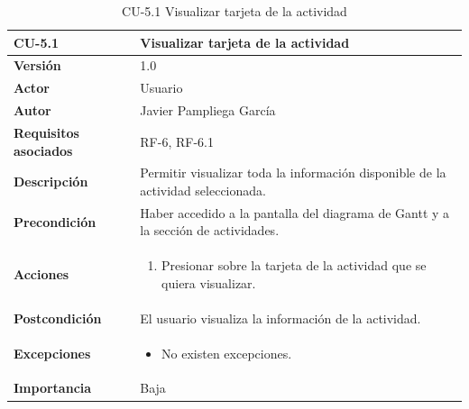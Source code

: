 \begin{table}[p]
	\centering
	\begin{tabularx}{\linewidth}{ p{} p{} }
		\toprule
		\textbf{CU-5.1}    & \textbf{Visualizar tarjeta de la actividad}\\
		\toprule
		\textbf{Versión}              & 1.0    \\
            \textbf{Actor}                & Usuario \\
		\textbf{Autor}                & Javier Pampliega García \\
		\textbf{Requisitos asociados} & RF-6, RF-6.1\\
		\textbf{Descripción}          & Permitir visualizar toda la información disponible de la actividad seleccionada. \\
		\textbf{Precondición}         & Haber accedido a la pantalla del diagrama de Gantt y a la sección de actividades. \\
		\textbf{Acciones}             &
		\begin{enumerate}
			\def\labelenumi{\arabic{enumi}.}
			\tightlist
			\item Presionar sobre la tarjeta de la actividad que se quiera visualizar.
		\end{enumerate}\\
		\textbf{Postcondición}        & El usuario visualiza la información de la actividad. \\
		\textbf{Excepciones}          & \begin{itemize}
		    \item No existen excepciones.
		\end{itemize} \\
		\textbf{Importancia}          & Baja \\
		\bottomrule
	\end{tabularx}
	\caption{CU-5.1 Visualizar tarjeta de la actividad}
\end{table}

